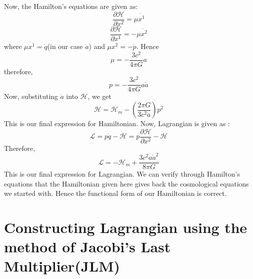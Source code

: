 \documentclass[12pt]{article}
\begin{document}
Now, the Hamilton's equations are given as:
\begin{equation}
\frac{\partial \mathcal{H}}{\partial x^{2}} = \mu \dot{x^{1}}
\end{equation}
\begin{equation}
\frac{\partial \mathcal{H}}{\partial x^{1}}=-\mu \dot{x^{2}}
\end{equation}
where $\mu \dot{x^{1}}= \dot{q}$(in our case $\dot{a}$) and $\mu \dot{x^{2}}= -\dot{p}$. Hence
\begin{equation}
\mu = -\frac{3 c^{2}}{4 \pi G} a
\end{equation} 
therefore,
\begin{equation}
p=-\frac{3 c^{2}}{4 \pi G} a \dot{a}
\end{equation}
Now, substituting $\dot{a}$ into $\mathcal{H}$, we get
\begin{equation}
\mathcal{H}=\mathcal{H}_{m} - \left(\frac{2 \pi G}{3 c^{2} a}\right) p^{2}
\end{equation}
This is our final expression for Hamiltonian. Now, Lagrangian is given as :
\begin{equation}
\mathcal{L} = p\dot{q} - \mathcal{H}= p \frac{\partial \mathcal{H}}{\partial x^{2}} - \mathcal{H}
\end{equation}
Therefore,
\begin{equation}
\mathcal{L} = -\mathcal{H}_{m} + \frac{3 c^{2} a \dot{a}^{2}}{8 \pi G}
\end{equation}
This is our final expression for Lagrangian. We can verify through Hamilton's equations that the Hamiltonian given here gives back the cosmological equations we started with. Hence the functional form of our Hamiltonian is correct.

\section*{Constructing Lagrangian using the method of Jacobi's Last Multiplier(JLM)}\label{IV}
\end{document}
